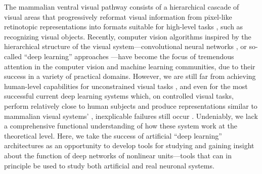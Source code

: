 The mammalian ventral visual pathway consists of a hierarchical cascade of visual areas that progressively reformat visual information from pixel-like retinotopic representations into formats suitable for high-level tasks \cite{dicarlo2007untangling, dicarlo2012does}, such as recognizing visual objects. Recently, computer vision algorithms inspired by the hierarchical structure of the visual system---convolutional neural networks \cite{fukushima1980neocognitron, lecun1998gradient, riesenhuber1999hierarchical}, or so-called ``deep learning'' approaches \cite{krizhevsky2012imagenet}---have become the focus of tremendous attention in the computer vision and machine learning communities, due to their success in a variety of practical domains. However, we are still far from achieving human-level capabilities for unconstrained visual tasks \cite{ghodrati2014feedforward}, and even for the most successful current deep learning systems which, on controlled visual tasks, perform relatively close to human subjects \cite{serre2007feedforward, cirecsan2012multi, russakovsky2014imagenet, taigman2013deepface, sun2014deep, viglarge} and produce representations similar to mammalian visual systems' \cite{yamins2014performance, cadieu2014deep}, inexplicable failures still occur \cite{szegedy2013intriguing}. Undeniably, we lack a comprehensive functional understanding of how these system work at the theoretical level. Here, we take the success of artificial ``deep learning'' architectures as an opportunity to develop tools for studying and gaining insight about the function of deep networks of nonlinear units---tools that can in principle be used to study both artificial and real neuronal systems. 


